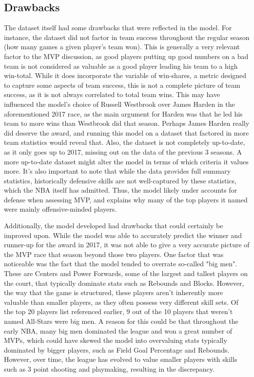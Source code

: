 \documentclass{article}
\begin{document}
\subsection{Drawbacks}

The dataset itself had some drawbacks that were reflected in the model. For instance, the dataset did not factor in team success throughout the regular season (how many games a given player's team won). This is generally a very relevant factor to the MVP discussion, as good players putting up good numbers on a bad team is not considered as valuable as a good player leading his team to a high win-total. While it does incorporate the variable of win-shares, a metric designed to capture some aspects of team success, this is not a complete picture of team success, as it is not always correlated to total team wins. This may have influenced the model's choice of Russell Westbrook over James Harden in the aforementioned 2017 race, as the main argument for Harden was that he led his team to more wins than Westbrook did that season. Perhaps James Harden really did deserve the award, and running this model on a dataset that factored in more team statistics would reveal that. Also, the dataset is not completely up-to-date, as it only goes up to 2017, missing out on the data of the previous 3 seasons. A more up-to-date dataset might alter the model in terms of which criteria it values more. It's also important to note that while the data provides full summary statistics, historically defensive skills are not well-captured by these statistics, which the NBA itself has admitted. Thus, the model likely under accounts for defense when assessing MVP, and explains why many of the top players it named were mainly offensive-minded players.

Additionally, the model developed had drawbacks that could certainly be improved upon. While the model was able to accurately predict the winner and runner-up for the award in 2017, it was not able to give a very accurate picture of the MVP race that season beyond those two players. One factor that was noticeable was the fact that the model tended to overrate so-called "big men". These are Centers and Power Forwards, some of the largest and tallest players on the court, that typically dominate stats such as Rebounds and Blocks. However, the way that the game is structured, these players aren't inherently more valuable than smaller players, as they often possess very different skill sets. Of the top 20 players list referenced earlier, 9 out of the 10 players that weren't named All-Stars were big men. A reason for this could be that throughout the early NBA, many big men dominated the league and won a great number of MVPs, which could have skewed the model into overvaluing stats typically dominated by bigger players, such as Field Goal Percentage and Rebounds. However, over time, the league has evolved to value smaller players with skills such as 3 point shooting and playmaking, resulting in the discrepancy.
\end{document}
